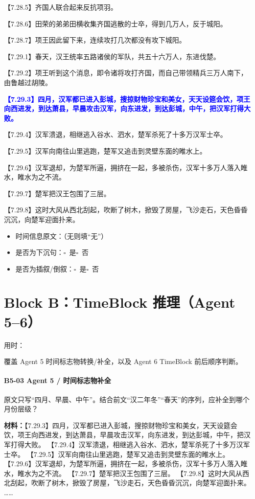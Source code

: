 \documentclass[fontset=none,11pt,a4paper]{ctexart}
\newcommand{\answerline}[1]{\underline{\hspace{#1}}}
\newcommand{\choicebox}[1]{$\square$~#1}
\newcommand{\blocktime}{\vspace{0.25em}\noindent 用时：\answerline{4cm}\par\vspace{0.6em}}
\begin{document}
\noindent 【7.28.5】齐国人联合起来反抗项羽。\par
\noindent 【7.28.6】田荣的弟弟田横收集齐国逃散的士卒，得到几万人，反于城阳。\par
\noindent 【7.28.7】项王因此留下来，连续攻打几次都没有攻下城阳。\par
\noindent 【7.29.1】春天，汉王统率五路诸侯的军队，共五十六万人，东进伐楚。\par
\noindent 【7.29.2】项王听到这个消息，即令诸将攻打齐国，而自己带领精兵三万人南下，由鲁越过胡陵。\par
\noindent \textcolor{blue}{\textbf{【7.29.3】四月，汉军都已进入彭城，搜掠财物珍宝和美女，天天设筵会饮，项王向西进发，到达萧县，早晨攻击汉军，向东进发，到达彭城，中午，把汉军打得大败。}}\par
\noindent 【7.29.4】汉军溃退，相继逃入谷水、泗水，楚军杀死了十多万汉军士卒。\par
\noindent 【7.29.5】汉军向南往山里逃跑，楚军又追击到灵壁东面的睢水上。\par
\noindent 【7.29.6】汉军退却，为楚军所逼，拥挤在一起，多被杀伤，汉军十多万人落入睢水，睢水为之不流。\par
\noindent 【7.29.7】楚军把汉王包围了三层。\par
\noindent 【7.29.8】这时大风从西北刮起，吹断了树木，掀毁了房屋，飞沙走石，天色昏昏沉沉，向楚军迎面扑来。\par

\begin{itemize}
  \item 时间信息原文：\answerline{7.5cm}（无则填“无”）
  \item 是否为下沉句：\choicebox{是}\quad \choicebox{否}
  \item 是否为插叙/倒叙：\choicebox{是}\quad \choicebox{否}
\end{itemize}


\newpage
\section{Block B：TimeBlock 推理（Agent 5--6）}
\blocktime
覆盖 Agent 5 时间标志物转换/补全，以及 Agent 6 TimeBlock 前后顺序判断。

\paragraph{B5-03 \quad Agent 5 / 时间标志物补全}
原文只写“四月、早晨、中午”。结合前文“汉二年冬”“春天”的序列，应补全到哪个月份层级？


\textbf{材料：}【7.29.3】四月，汉军都已进入彭城，搜掠财物珍宝和美女，天天设筵会饮，项王向西进发，到达萧县，早晨攻击汉军，向东进发，到达彭城，中午，把汉军打得大败。 【7.29.4】汉军溃退，相继逃入谷水、泗水，楚军杀死了十多万汉军士卒。 【7.29.5】汉军向南往山里逃跑，楚军又追击到灵壁东面的睢水上。 【7.29.6】汉军退却，为楚军所逼，拥挤在一起，多被杀伤，汉军十多万人落入睢水，睢水为之不流。 【7.29.7】楚军把汉王包围了三层。 【7.29.8】这时大风从西北刮起，吹断了树木，掀毁了房屋，飞沙走石，天色昏昏沉沉，向楚军迎面扑来。 ……
\end{document}
